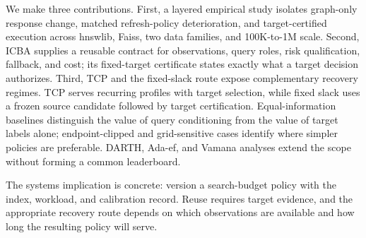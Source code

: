 We make three contributions. First, a layered empirical study isolates graph-only response change, matched refresh-policy deterioration, and target-certified execution across hnswlib, Faiss, two data families, and 100K-to-1M scale. Second, ICBA supplies a reusable contract for observations, query roles, risk qualification, fallback, and cost; its fixed-target certificate states exactly what a target decision authorizes. Third, TCP and the fixed-slack route expose complementary recovery regimes. TCP serves recurring profiles with target selection, while fixed slack uses a frozen source candidate followed by target certification. Equal-information baselines distinguish the value of query conditioning from the value of target labels alone; endpoint-clipped and grid-sensitive cases identify where simpler policies are preferable. DARTH, Ada-ef, and Vamana analyses extend the scope without forming a common leaderboard.

The systems implication is concrete: version a search-budget policy with the index, workload, and calibration record. Reuse requires target evidence, and the appropriate recovery route depends on which observations are available and how long the resulting policy will serve.
